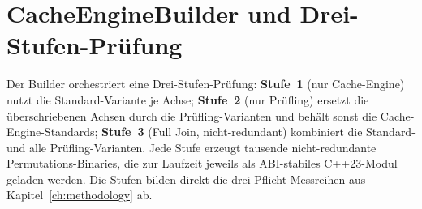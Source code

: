 \section{CacheEngineBuilder und Drei-Stufen-Prüfung}\label{sec:builder}

Der Builder orchestriert eine Drei-Stufen-Prüfung: \textbf{Stufe~1} (nur Cache-Engine) nutzt
die Standard-Variante je Achse; \textbf{Stufe~2} (nur Prüfling) ersetzt die überschriebenen
Achsen durch die Prüfling-Varianten und behält sonst die Cache-Engine-Standards;
\textbf{Stufe~3} (Full Join, nicht-redundant) kombiniert die Standard- und alle
Prüfling-Varianten. Jede Stufe erzeugt tausende nicht-redundante Permutations-Binaries, die
zur Laufzeit jeweils als ABI-stabiles C++23-Modul geladen werden. Die Stufen bilden direkt
die drei Pflicht-Messreihen aus Kapitel~\ref{ch:methodology} ab.
